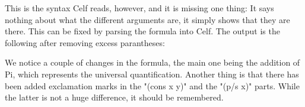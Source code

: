 \begin{textoform}
\end{textoform}

This is the syntax Celf reads, however, and it is missing one thing: It says nothing about what the different arguments are, it simply shows that they are there. This can be fixed by parsing the formula into Celf. The output is the following after removing excess parantheses:

\begin{textoform}
\end{textoform}

We notice a couple of changes in the formula, the main one being the addition of Pi, which represents the universal quantification. Another thing is that there has been added exclamation marks in the "(cons x y)" and the "(p/s x)" parts. While the latter is not a huge difference, it should be remembered.


